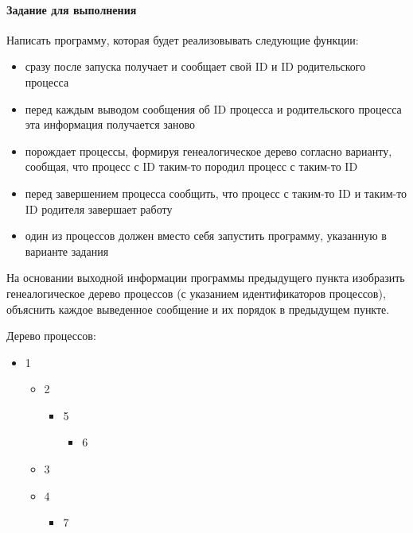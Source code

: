\paragraph{Задание для выполнения}
Написать программу, которая будет реализовывать следующие функции:
\begin{itemize}
    \item сразу после запуска получает и сообщает свой ID и ID родительского процесса
    \item перед каждым выводом сообщения об ID процесса и родительского процесса эта информация получается заново
    \item порождает процессы, формируя генеалогическое дерево согласно варианту, сообщая, что процесс с ID таким-то породил процесс с таким-то ID
    \item перед завершением процесса сообщить, что процесс с таким-то ID и таким-то ID родителя завершает работу
    \item один из процессов должен вместо себя запустить программу, указанную в варианте задания
\end{itemize}
На основании выходной информации программы предыдущего пункта изобразить генеалогическое дерево процессов (с указанием идентификаторов процессов), объяснить каждое выведенное сообщение и их порядок в предыдущем пункте.




Дерево процессов:
\begin{itemize}
    \item 1
    \begin{itemize}
        \item 2
        \begin{itemize}
            \item 5
            \begin{itemize}
                \item 6
            \end{itemize}
        \end{itemize}
        \item 3
        \item 4
        \begin{itemize}
            \item 7
        \end{itemize}
    \end{itemize}
\end{itemize}